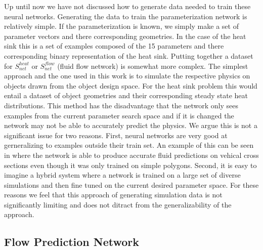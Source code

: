 \documentclass{article} %
\begin{document}
Up until now we have not discussed how to generate data needed to train these neural networks. Generating the data to train the parameterization network is relatively simple. If the parameterization is known, we simply make a set of parameter vectors and there corresponding geometries. In the case of the heat sink this is a set of examples composed of the 15 parameters and there corresponding binary representation of the heat sink. Putting together a dataset for $S^{heat}_{net}$ or $S^{flow}_{net}$ (fluid flow network) is somewhat more complex. The simplest approach and the one used in this work is to simulate the respective physics on objects drawn from the object design space. For the heat sink problem this would entail a dataset of object geometries and their corresponding steady state heat distributions. This method has the disadvantage that the network only sees examples from the current parameter search space and if it is changed the network may not be able to accurately predict the physics. We argue this is not a significant issue for two reasons. First, neural networks are very good at gerneralizing to examples outside their train set. An example of this can be seen in \cite{} where the network is able to produce accurate fluid predictions on vehical cross sections even though it was only trained on simple polygons. Second, it is easy to imagine a hybrid system where a network is trained on a large set of diverse simulations and then fine tuned on the current desired parameter space. For these reasons we feel that this approach of generating simulation data is not significantly limiting and does not ditract from the generalizability of the approach.

\subsection{Flow Prediction Network}
\end{document}
